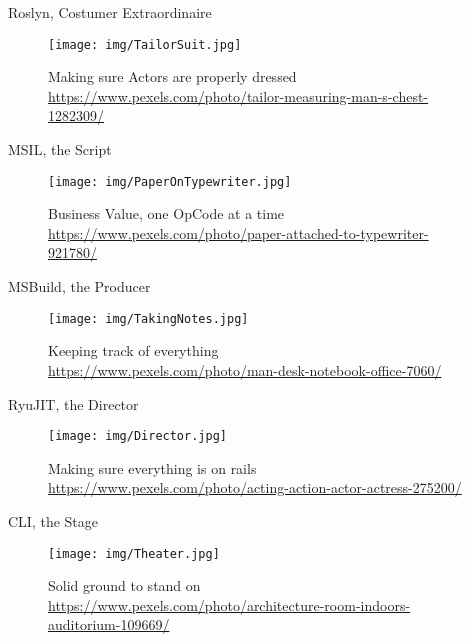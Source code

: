 \documentclass[10pt]{beamer}
\begin{document}
\begin{frame}{Roslyn, Costumer Extraordinaire}
    \begin{figure}
        \centering
        \texttt{[image: img/TailorSuit.jpg]}
        \caption{Making sure Actors are properly dressed \\ \tiny{\href{Photo by rawpixel.com from Pexels}{https://www.pexels.com/photo/tailor-measuring-man-s-chest-1282309/}}}
    \end{figure}
\end{frame}

\begin{frame}{MSIL, the Script}
    \begin{figure}
        \centering
        \texttt{[image: img/PaperOnTypewriter.jpg]}
        \caption{Business Value, one OpCode at a time \\ \tiny{\href{Photo by rawpixel.com from Pexels}{https://www.pexels.com/photo/paper-attached-to-typewriter-921780/}}}
    \end{figure}    
\end{frame}

\begin{frame}{MSBuild, the Producer}
    \begin{figure}
        \centering
        \texttt{[image: img/TakingNotes.jpg]}
        \caption{Keeping track of everything \\ \tiny{\href{Photo by Startup Stock Photos from Pexels}{https://www.pexels.com/photo/man-desk-notebook-office-7060/}}}
    \end{figure}
\end{frame}

\begin{frame}{RyuJIT, the Director}
    \begin{figure}
        \centering
        \texttt{[image: img/Director.jpg]}
        \caption{Making sure everything is on rails \\ \tiny{\href{Photo by Pixabay from Pexels}{https://www.pexels.com/photo/acting-action-actor-actress-275200/}}}
    \end{figure}
\end{frame}

\begin{frame}{CLI, the Stage}
    \begin{figure}
        \centering
        \texttt{[image: img/Theater.jpg]}
        \caption{Solid ground to stand on \\ \tiny{\href{Photo by Donald Tong from Pexels}{https://www.pexels.com/photo/architecture-room-indoors-auditorium-109669/}}}
    \end{figure}
\end{frame}
\end{document}
